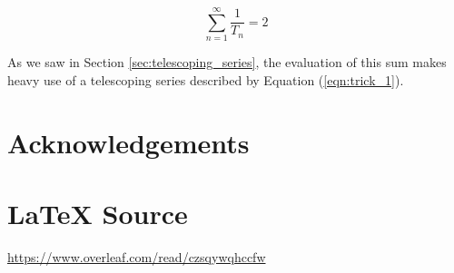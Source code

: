 \documentclass{article}
\theoremstyle{definition}
\begin{document}
\begin{equation*}
\displaystyle \sum \limits_{n=1}^{\infty} 
\frac{1}{T_n} =  2
\end{equation*}

\bigskip
\noindent
As we saw in Section \ref{sec:telescoping_series}, the evaluation
of this sum makes heavy use of a telescoping series described by
Equation (\ref{eqn:trick_1}).
%
%
%
\section*{Acknowledgements}
%
%
\section*{\LaTeX \hspace{0.10 mm} Source}
\url{https://www.overleaf.com/read/czsqywqhccfw}
%
%
%


%
%
\end{document}
